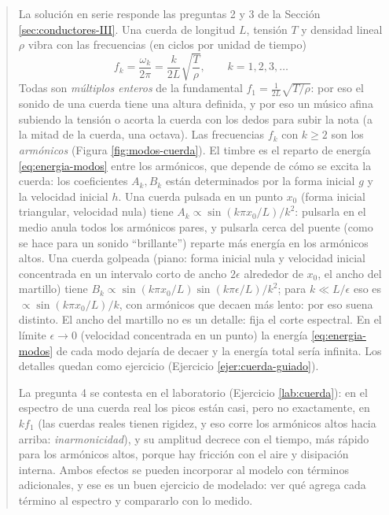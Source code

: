 \documentclass[12pt, a4paper]{amsbook}
\theoremstyle{remark}
\theoremstyle{definition}
\numberwithin{section}{chapter}
\numberwithin{subsection}{section}
\numberwithin{equation}{section}
\numberwithin{figure}{chapter}
\newenvironment{volvemos}[1]{\medskip\par\noindent\begin{quote}\noindent{\bf Volvemos al problema: #1.}\par\smallskip}{\end{quote}\medskip}
\begin{document}
\begin{volvemos}{la cuerda vibrante}
La solución en serie responde las preguntas 2 y 3 de la Sección \ref{sec:conductores-III}. Una cuerda de longitud $L$, tensión $T$ y densidad lineal $\rho$ vibra con las frecuencias (en ciclos por unidad de tiempo)
$$
f_k = \frac{\omega_k}{2\pi} = \frac{k}{2L}\sqrt{\frac{T}{\rho}},\qquad k=1,2,3,\dots
$$
Todas son \emph{múltiplos enteros} de la fundamental $f_1 = \frac{1}{2L}\sqrt{T/\rho}$: por eso el sonido de una cuerda tiene una altura definida, y por eso un músico afina subiendo la tensión o acorta la cuerda con los dedos para subir la nota (a la mitad de la cuerda, una octava). Las frecuencias $f_k$ con $k\ge 2$ son los \emph{armónicos} (Figura \ref{fig:modos-cuerda}). El timbre es el reparto de energía \eqref{eq:energia-modos} entre los armónicos, que depende de cómo se excita la cuerda: los coeficientes $A_k,B_k$ están determinados por la forma inicial $g$ y la velocidad inicial $h$. Una cuerda pulsada en un punto $x_0$ (forma inicial triangular, velocidad nula) tiene $A_k\propto \sin(k\pi x_0/L)/k^2$: pulsarla en el medio anula todos los armónicos pares, y pulsarla cerca del puente (como se hace para un sonido ``brillante'') reparte más energía en los armónicos altos. Una cuerda golpeada (piano: forma inicial nula y velocidad inicial concentrada en un intervalo corto de ancho $2\epsilon$ alrededor de $x_0$, el ancho del martillo) tiene $B_k\propto\sin(k\pi x_0/L)\sin(k\pi\epsilon/L)/k^2$; para $k\ll L/\epsilon$ eso es $\propto\sin(k\pi x_0/L)/k$, con armónicos que decaen más lento: por eso suena distinto. El ancho del martillo no es un detalle: fija el corte espectral. En el límite $\epsilon\to0$ (velocidad concentrada en un punto) la energía \eqref{eq:energia-modos} de cada modo dejaría de decaer y la energía total sería infinita. Los detalles quedan como ejercicio (Ejercicio \ref{ejer:cuerda-guiado}).

La pregunta 4 se contesta en el laboratorio (Ejercicio \ref{lab:cuerda}): en el espectro de una cuerda real los picos están casi, pero no exactamente, en $kf_1$ (las cuerdas reales tienen rigidez, y eso corre los armónicos altos hacia arriba: \emph{inarmonicidad}), y su amplitud decrece con el tiempo, más rápido para los armónicos altos, porque hay fricción con el aire y disipación interna. Ambos efectos se pueden incorporar al modelo con términos adicionales, y ese es un buen ejercicio de modelado: ver qué agrega cada término al espectro y compararlo con lo medido.
\end{volvemos}
\end{document}
